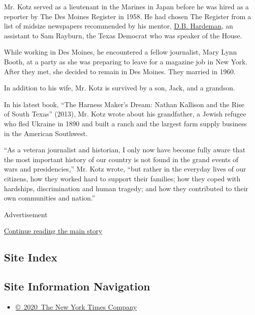 Mr. Kotz served as a lieutenant in the Marines in Japan before he was
hired as a reporter by The Des Moines Register in 1958. He had chosen
The Register from a list of midsize newspapers recommended by his
mentor,
\href{https://www.nytimes3xbfgragh.onion/1984/06/25/us/some-observations-from-a-ringside-seat.html}{D.B.
Hardeman}, an assistant to Sam Rayburn, the Texas Democrat who was
speaker of the House.

While working in Des Moines, he encountered a fellow journalist, Mary
Lynn Booth, at a party as she was preparing to leave for a magazine job
in New York. After they met, she decided to remain in Des Moines. They
married in 1960.

In addition to his wife, Mr. Kotz is survived by a son, Jack, and a
grandson.

In his latest book, ``The Harness Maker's Dream: Nathan Kallison and the
Rise of South Texas'' (2013), Mr. Kotz wrote about his grandfather, a
Jewish refugee who fled Ukraine in 1890 and built a ranch and the
largest farm supply business in the American Southwest.

``As a veteran journalist and historian, I only now have become fully
aware that the most important history of our country is not found in the
grand events of wars and presidencies,'' Mr. Kotz wrote, ``but rather in
the everyday lives of our citizens, how they worked hard to support
their families; how they coped with hardships, discrimination and human
tragedy; and how they contributed to their own communities and nation.''

Advertisement

\protect\hyperlink{after-bottom}{Continue reading the main story}

\hypertarget{site-index}{%
\subsection{Site Index}\label{site-index}}

\hypertarget{site-information-navigation}{%
\subsection{Site Information
Navigation}\label{site-information-navigation}}

\begin{itemize}
\tightlist
\item
  \href{https://help.nytimes3xbfgragh.onion/hc/en-us/articles/115014792127-Copyright-notice}{©~2020~The
  New York Times Company}
\end{itemize}

